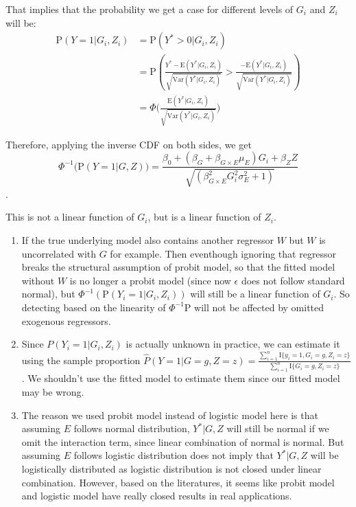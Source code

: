 \documentclass[]{article}
\begin{document}
That implies that the probability we get a case for different levels of
\(G_i\) and \(Z_i\) will be:
\begin{equation}\label{eqn:probitModelWithInteraction_Prob} 
\begin{aligned} 
\text{P}(Y = 1 | G_i, Z_i) &= \text{P}(Y^* > 0| G_i, Z_i) \\ 
                           &= \text{P}(\frac{Y^*  - \text{E}(Y^* |G_i,Z_i)}{\sqrt{\text{Var}(Y^* |G_i,Z_i)}} > \frac{-\text{E}(Y^* |G_i,Z_i)}{\sqrt{\text{Var}(Y^* |G_i,Z_i)}}) \\
                           &= \Phi \bigg( \frac{\text{E}(Y^* |G_i,Z_i)}{\sqrt{\text{Var}(Y^* |G_i,Z_i)}} \bigg)
\end{aligned}
\end{equation}

Therefore, applying the inverse CDF on both sides, we get
\[\Phi^{-1} \bigg(\text{P}(Y = 1 | G, Z) \bigg) = \frac{\beta_0+(\beta_G + \beta_{G\times E} \mu_E)G_i + \beta_Z Z}{\sqrt{(\beta_{G\times E}^2 G_i^2 \sigma_E^2 + 1)}} \].

This is not a linear function of \(G_i\), but is a linear function of
\(Z_i\).

\begin{enumerate}
\item If the true underlying model also contains another regressor $W$ but $W$ is uncorrelated with $G$ for example. Then eventhough ignoring that regressor breaks the structural assumption of probit model, so that the fitted model without $W$ is no longer a probit model (since now $\epsilon$ does not follow standard normal), but $\Phi^{-1}(\text{P}(Y_i = 1|G_i,Z_i))$ will still be a linear function of $G_i$. So detecting based on the linearity of $\Phi^{-1}\text{P}$ will not be affected by omitted exogenous regressors.
\item Since $P(Y_i = 1|G_i,Z_i)$ is actually unknown in practice, we can estimate it using the sample proportion $\hat{P}(Y = 1|G = g,Z = z) = \frac{\sum_{i=1}^{n} \text{I}\{y_i =1,G_{i} = g, Z_{i} = z\}}{\sum_{i=1}^{n}  \text{I}\{G_{i} = g, Z_{i} = z\}}$. We shouldn't use the fitted model to estimate them since our fitted model may be wrong.
\item The reason we used probit model instead of logistic model here is that assuming $E$ follows normal distribution, $Y^*|G,Z$ will still be normal if we omit the interaction term, since linear combination of normal is normal. But assuming $E$ follows logistic distribution does not imply that $Y^*|G,Z$ will be logistically distributed as logistic distribution is not closed under linear combination. However, based on the literatures, it seems like probit model and logistic model have really closed results in real applications.
\end{enumerate}
\end{document}
